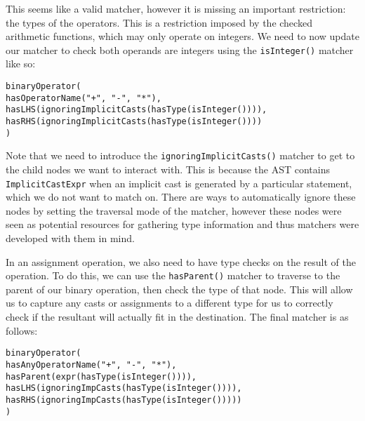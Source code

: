 This seems like a valid matcher, however it is missing an important restriction: the types of the operators. This is a restriction imposed by the checked arithmetic functions, which may only operate on integers. We need to now update our matcher to check both operands are integers using the \texttt{isInteger()} matcher like so:
\begin{center}
\parbox{0.9\linewidth}{
\texttt{binaryOperator(\\
\hspace*{4em}hasOperatorName("+", "-", "*"),\\
\hspace*{4em}hasLHS(ignoringImplicitCasts(hasType(isInteger()))),\\
\hspace*{4em}hasRHS(ignoringImplicitCasts(hasType(isInteger())))\\
)}
}
\end{center}

Note that we need to introduce the \texttt{ignoringImplicitCasts()} matcher to get to the child nodes we want to interact with. This is because the AST contains \texttt{ImplicitCastExpr} when an implicit cast is generated by a particular statement, which we do not want to match on. There are ways to automatically ignore these nodes by setting the traversal mode of the matcher, however these nodes were seen as potential resources for gathering type information and thus matchers were developed with them in mind.

In an assignment operation, we also need to have type checks on the result of the operation. To do this, we can use the \texttt{hasParent()} matcher to traverse to the parent of our binary operation, then check the type of that node. This will allow us to capture any casts or assignments to a different type for us to correctly check if the resultant will actually fit in the destination. The final matcher is as follows:
\begin{center}
\parbox{0.9\linewidth}{
\texttt{binaryOperator(\\
\hspace*{4em}hasAnyOperatorName("+", "-", "*"),\\
\hspace*{4em}hasParent(expr(hasType(isInteger()))),\\
\hspace*{4em}hasLHS(ignoringImpCasts(hasType(isInteger()))),\\
\hspace*{4em}hasRHS(ignoringImpCasts(hasType(isInteger()))))\\
)}
}
\end{center}

